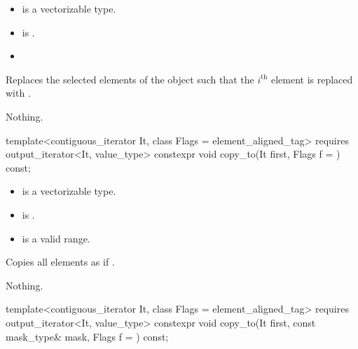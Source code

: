 \begin{itemdescr}
  \pnum\constraints
  \begin{itemize}
    \item {} is a vectorizable type.
    \item {} is .
  \end{itemize}

  \pnum\requires
  \begin{itemize}
    \item \validMaskedRange
  \end{itemize}

  \pnum\effects
  Replaces the selected elements of the  object such that the $i^\text{th}$ element is replaced with  \forallmaskedi.

  \pnum\throws Nothing.
\end{itemdescr}

\begin{itemdecl}
template<contiguous_iterator It, class Flags = element_aligned_tag>
  requires output_iterator<It, value_type>
  constexpr void copy_to(It first, Flags f = {}) const;
\end{itemdecl}

\begin{itemdescr}
  \pnum\constraints
  \begin{itemize}
    \item {} is a vectorizable type.
    \item {} is .
  \end{itemize}

  \pnum\requires
  \begin{itemize}
    \item \tcode{[first, first + size())} is a valid range.
  \end{itemize}

  \pnum\effects
  Copies all  elements as if  \foralli.

  \pnum\throws Nothing.
\end{itemdescr}

\begin{itemdecl}
template<contiguous_iterator It, class Flags = element_aligned_tag>
  requires output_iterator<It, value_type>
  constexpr void copy_to(It first, const mask_type& mask, Flags f = {}) const;
\end{itemdecl}

